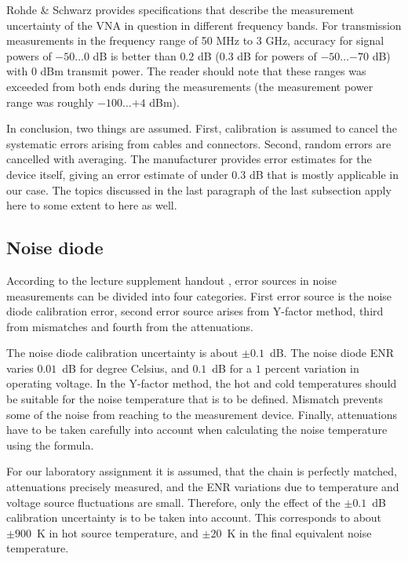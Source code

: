 \documentclass[a4paper, 12pt]{article}
\begin{document}
Rohde \& Schwarz provides specifications that describe the measurement uncertainty 
of the VNA in question in different frequency bands. For transmission measurements 
in the frequency range of 50 MHz to 3 GHz, accuracy for signal powers of $-50 \ldots 0$ 
dB is better than $0.2$ dB ($0.3$ dB for powers of $-50 \ldots {-70}$ dB) with 0 dBm 
transmit power. \cite{vna} The reader should note that these ranges was exceeded 
from both ends during the measurements (the measurement power range was roughly 
$-100 \ldots {+4}$ dBm). 

In conclusion, two things are assumed. First, calibration is assumed to cancel the 
systematic errors arising from cables and connectors. Second, random errors are 
cancelled with averaging. The manufacturer provides error estimates for the device 
itself, giving an error estimate of under $0.3$ dB that is mostly applicable in 
our case. The topics discussed in the last paragraph of the last subsection apply 
here to some extent to here as well.


\subsection{Noise diode}

According to the lecture supplement handout \cite{kakkaa_huuleen}, error sources in noise measurements can be divided into four categories. First error source is the noise diode calibration error, second error source arises from Y-factor method, third from mismatches and fourth from the attenuations.

The noise diode calibration uncertainty is about $\pm0.1$~dB. The noise diode ENR varies $0.01$~dB for degree Celsius, and $0.1$~dB for a $1$ percent variation in operating voltage. In the Y-factor method, the hot and cold temperatures should be suitable for the noise temperature that is to be defined. Mismatch prevents some of the noise from reaching to the measurement device. Finally, attenuations have to be taken carefully into account when calculating the noise temperature using the formula.

For our laboratory assignment it is assumed, that the chain is perfectly matched, attenuations precisely measured, and the ENR variations due to temperature and voltage source fluctuations are small. Therefore, only the effect of the $\pm 0.1$~dB calibration uncertainty is to be taken into account. This corresponds to about $\pm900$~K in hot source temperature, and $\pm20$~K in the final equivalent noise temperature.
\newpage
\end{document}
